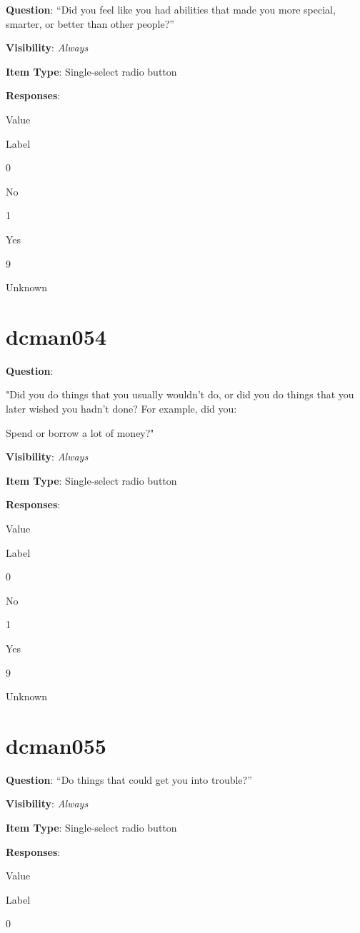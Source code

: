 \documentclass[]{book}
\begin{document}
\textbf{Question}: ``Did you feel like you had abilities that made you more special, smarter, or better than other people?''

\textbf{Visibility}: \emph{Always}

\textbf{Item Type}: Single-select radio button

\textbf{Responses}:

Value

Label

0

No

1

Yes

9

Unknown

\hypertarget{dcman054}{%
\section{dcman054}\label{dcman054}}

\textbf{Question}:

"Did you do things that you usually wouldn't do, or did you do things that you later wished you hadn't done? For example, did you:

Spend or borrow a lot of money?"

\textbf{Visibility}: \emph{Always}

\textbf{Item Type}: Single-select radio button

\textbf{Responses}:

Value

Label

0

No

1

Yes

9

Unknown

\hypertarget{dcman055}{%
\section{dcman055}\label{dcman055}}

\textbf{Question}: ``Do things that could get you into trouble?''

\textbf{Visibility}: \emph{Always}

\textbf{Item Type}: Single-select radio button

\textbf{Responses}:

Value

Label

0
\end{document}
